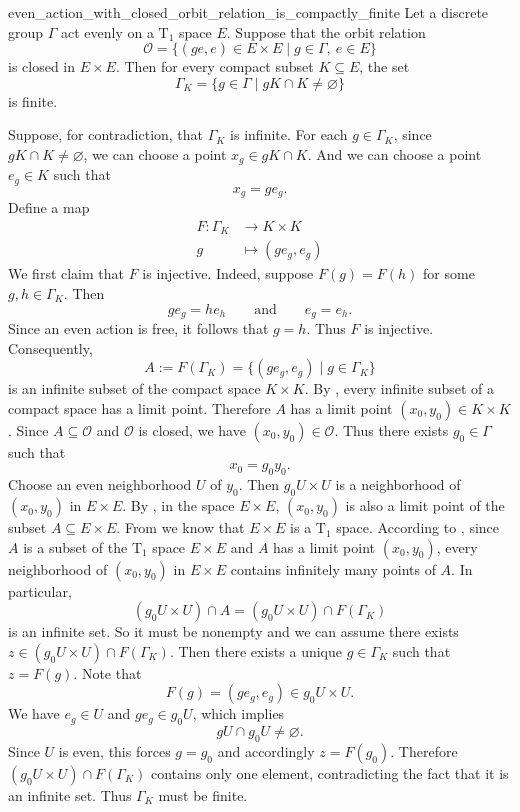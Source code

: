 \documentclass{report}
\begin{document}
\begin{lemma}{}{even_action_with_closed_orbit_relation_is_compactly_finite}
Let a discrete group \(\Gamma\) act evenly on a $\mathrm{T}_1$ space \(E\). Suppose that the orbit relation
\[
    \mathcal O
    =
    \{(ge,e)\in E\times E \mid g\in \Gamma,\ e\in E\}
\]
is closed in \(E\times E\). Then for every compact subset \(K\subseteq E\), the set
\[
    \Gamma_K
    =
    \{g\in \Gamma \mid gK\cap K\neq\varnothing\}
\]
is finite.
\end{lemma}

\begin{prf}
Suppose, for contradiction, that \(\Gamma_K\) is infinite. For each \(g\in \Gamma_K\), since $gK\cap K\neq \varnothing$, we can choose a point \(x_g\in gK\cap K\). And we can choose a point \(e_g\in K\) such that
    \[
        x_g=g e_g.
    \]
    Define a map
	\begin{align*}
		 F:\Gamma_K & \longrightarrow K\times K \\
		 g        & \longmapsto (ge_g,e_g)
	\end{align*}
	We first claim that \(F\) is injective. Indeed, suppose $F(g)=F(h)$ for some \(g,h\in \Gamma_K\). Then
    \[
        ge_g=he_h
        \qquad\text{and}\qquad
        e_g=e_h.
    \]
    Since an even action is free, it follows that \(g=h\). Thus \(F\) is injective. Consequently,
    \[
    	A:=F(\Gamma_K)=\{(ge_g,e_g)\mid g\in \Gamma_K\}
	\]
	is an infinite subset of the compact space \(K\times K\). By , every infinite subset of a compact space has a limit point. Therefore \(A\) has a limit point \((x_0,y_0)\in K\times K\). Since
\(A\subseteq \mathcal O\) and \(\mathcal O\) is closed, we have
\((x_0,y_0)\in \mathcal O\). Thus there exists \(g_0\in \Gamma\) such that
\[
    x_0=g_0y_0.
\]
Choose an even neighborhood \(U\) of \(y_0\). Then \(g_0U\times U\) is a
neighborhood of \((x_0,y_0)\) in \(E\times E\). By , in the space $E\times E$, $(x_0, y_0)$ is also a limit point of the subset $A\subseteq E\times E$. From  we know that $E\times E$ is a $\mathrm{T}_1$ space. According to , since $A$ is a subset of the $\mathrm{T}_1$ space $E\times E$ and $A$ has a limit point $(x_0,y_0)$, every neighborhood of $(x_0,y_0)$ in $E\times E$ contains infinitely many points of $A$. In particular,
\[
\left(g_0U\times U\right) \cap A=\left(g_0U\times U\right) \cap F(\Gamma_K)
\]
is an infinite set. So it must be nonempty and we can assume there exists $z\in \left(g_0U\times U\right) \cap F(\Gamma_K)$. Then there exists a unique $g\in \Gamma_K$ such that $z=F(g)$. Note that
\[
    F(g)=(ge_g,e_g)\in g_0U\times U.
\]
We have \(e_g\in U\) and \(ge_g\in g_0U\), which implies
\[
    gU\cap g_0U\neq\varnothing.
\]
Since \(U\) is even, this forces \(g=g_0\) and accordingly \(z=F(g_0)\). Therefore \(\left(g_0U\times U\right) \cap F(\Gamma_K)\) contains only one element, contradicting the fact that it is an infinite set. Thus \(\Gamma_K\) must be finite.
\end{prf}
\end{document}
